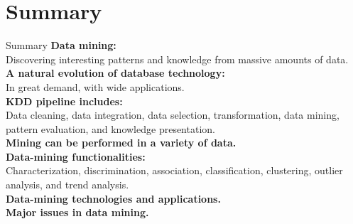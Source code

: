 \section{Summary}

\begin{frame}{Summary}
	\textbf{Data mining:}\\
	Discovering interesting patterns and knowledge from massive amounts of
	data.\\[0.2cm]

	\textbf{A natural evolution of database technology:}\\
	In great demand, with wide applications.\\[0.2cm]

	\textbf{KDD pipeline includes:}\\
	Data cleaning, data integration, data selection, transformation, data
	mining, pattern evaluation, and knowledge presentation.\\[0.2cm]

	\textbf{Mining can be performed in a variety of data.}\\
	\textbf{Data-mining functionalities:}\\
	Characterization, discrimination, association, classification, clustering,
	outlier analysis, and trend analysis.\\[0.2cm]

	\textbf{Data-mining technologies and applications.}\\
	\textbf{Major issues in data mining.}\\
\end{frame}
